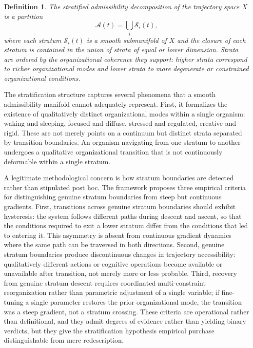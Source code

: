 \documentclass[12pt,a4paper]{report}
\theoremstyle{flyxion}
\newtheorem{definition}[theorem]{Definition}
\begin{document}
\begin{definition}
The \emph{stratified admissibility decomposition} of the trajectory space $X$ is a partition
\[
\mathcal{A}(t) = \bigcup_{i} \mathcal{S}_i(t),
\]
where each stratum $\mathcal{S}_i(t)$ is a smooth submanifold of $X$ and the closure of each stratum is contained in the union of strata of equal or lower dimension. Strata are ordered by the organizational coherence they support: higher strata correspond to richer organizational modes and lower strata to more degenerate or constrained organizational conditions.
\end{definition}

The stratification structure captures several phenomena that a smooth admissibility manifold cannot adequately represent. First, it formalizes the existence of qualitatively distinct organizational modes within a single organism: waking and sleeping, focused and diffuse, stressed and regulated, creative and rigid. These are not merely points on a continuum but distinct strata separated by transition boundaries. An organism navigating from one stratum to another undergoes a qualitative organizational transition that is not continuously deformable within a single stratum.

A legitimate methodological concern is how stratum boundaries are detected rather than stipulated post hoc. The framework proposes three empirical criteria for distinguishing genuine stratum boundaries from steep but continuous gradients. First, transitions across genuine stratum boundaries should exhibit hysteresis: the system follows different paths during descent and ascent, so that the conditions required to exit a lower stratum differ from the conditions that led to entering it. This asymmetry is absent from continuous gradient dynamics where the same path can be traversed in both directions. Second, genuine stratum boundaries produce discontinuous changes in trajectory accessibility: qualitatively different actions or cognitive operations become available or unavailable after transition, not merely more or less probable. Third, recovery from genuine stratum descent requires coordinated multi-constraint reorganization rather than parametric adjustment of a single variable; if fine-tuning a single parameter restores the prior organizational mode, the transition was a steep gradient, not a stratum crossing. These criteria are operational rather than definitional, and they admit degrees of evidence rather than yielding binary verdicts, but they give the stratification hypothesis empirical purchase distinguishable from mere redescription.
\end{document}
